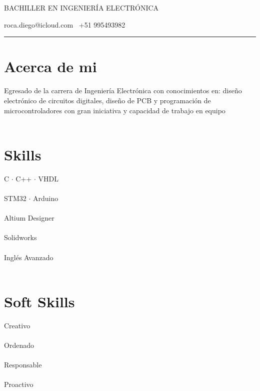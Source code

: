 \documentclass[12pt]{article}
\makeatletter
\renewcommand{\maketitle}{
  \begin{center}
    {\huge\bfseries
    \theauthor}

    \vspace{1em}

    {\Large
    BACHILLER EN INGENIERÍA ELECTRÓNICA}

    \vspace{1em}

    roca.diego@icloud.com \textbar\ +51 995493982

    \rule{\textwidth}{1pt}

    \vspace{0.5em}
  \end{center}
}
\makeatother
\begin{document}
  \thispagestyle{empty}
  
  \author{DIEGO YOVANI ROCA VEGA}
  \maketitle

  \begin{minipage}[t]{0.33\textwidth}

    \section{Acerca de mi}
      Egresado de la carrera de Ingeniería Electrónica con conocimientos en: diseño electrónico de circuitos digitales, diseño de PCB y programación de microcontroladores con gran iniciativa y capacidad de trabajo en equipo
      \\\\

    \section{Skills}
      C $\cdot$ C++ $\cdot$ VHDL
      \\\\
      STM32 $\cdot$ Arduino
      \\\\
      Altium Designer
      \\\\
      Solidworks
      \\\\
      Inglés Avanzado
      \\\\

    \section{Soft Skills}
      Creativo
      \\\\
      Ordenado
      \\\\
      Responsable
      \\\\
      Proactivo
      \\\\

  \end{minipage}
  \hfill
\end{document}
